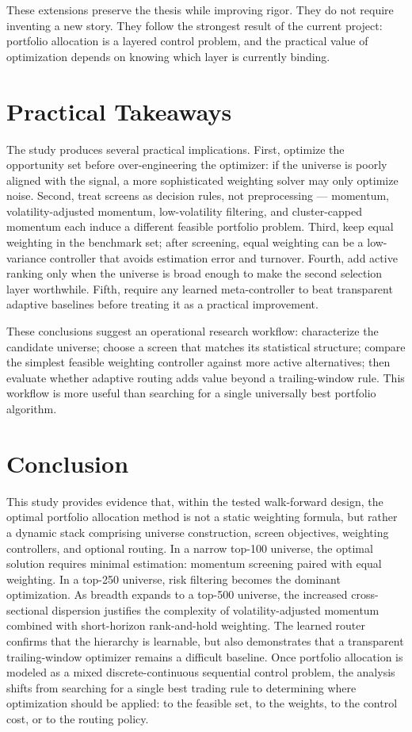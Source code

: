 \documentclass[journal,10pt]{IEEEtran}
\begin{document}
These extensions preserve the thesis while improving rigor. They do not require inventing a new story. They follow the strongest result of the current project: portfolio allocation is a layered control problem, and the practical value of optimization depends on knowing which layer is currently binding.

\section{Practical Takeaways}
The study produces several practical implications. First, optimize the opportunity set before over-engineering the optimizer: if the universe is poorly aligned with the signal, a more sophisticated weighting solver may only optimize noise. Second, treat screens as decision rules, not preprocessing — momentum, volatility-adjusted momentum, low-volatility filtering, and cluster-capped momentum each induce a different feasible portfolio problem. Third, keep equal weighting in the benchmark set; after screening, equal weighting can be a low-variance controller that avoids estimation error and turnover. Fourth, add active ranking only when the universe is broad enough to make the second selection layer worthwhile. Fifth, require any learned meta-controller to beat transparent adaptive baselines before treating it as a practical improvement.

These conclusions suggest an operational research workflow: characterize the candidate universe; choose a screen that matches its statistical structure; compare the simplest feasible weighting controller against more active alternatives; then evaluate whether adaptive routing adds value beyond a trailing-window rule. This workflow is more useful than searching for a single universally best portfolio algorithm.

\section{Conclusion}
This study provides evidence that, within the tested walk-forward design, the optimal portfolio allocation method is not a static weighting formula, but rather a dynamic stack comprising universe construction, screen objectives, weighting controllers, and optional routing. In a narrow top-100 universe, the optimal solution requires minimal estimation: momentum screening paired with equal weighting. In a top-250 universe, risk filtering becomes the dominant optimization. As breadth expands to a top-500 universe, the increased cross-sectional dispersion justifies the complexity of volatility-adjusted momentum combined with short-horizon rank-and-hold weighting. The learned router confirms that the hierarchy is learnable, but also demonstrates that a transparent trailing-window optimizer remains a difficult baseline. Once portfolio allocation is modeled as a mixed discrete-continuous sequential control problem, the analysis shifts from searching for a single best trading rule to determining where optimization should be applied: to the feasible set, to the weights, to the control cost, or to the routing policy.
\end{document}
